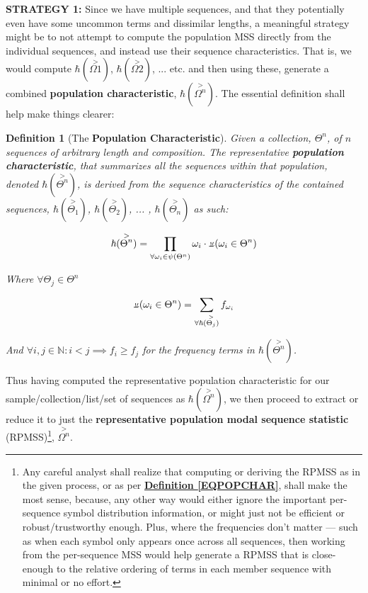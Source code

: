 \documentclass[a4paper, 18pt]{book} %
\newtheorem{defn}{Definition}
\newcommand{\invpi}{\rotatebox[origin=c]{180}{$\pi$}}
\begin{document}
\textbf{STRATEGY 1:} Since we have multiple sequences, and that they potentially even have some uncommon terms and dissimilar lengths, a meaningful strategy might be to not attempt to compute the population MSS directly from the individual sequences, and instead use their sequence characteristics. That is, we would compute $\hbar(\overset{>}{\Omega1})$, $\hbar(\overset{>}{\Omega2})$, ... etc. and then using these, generate a combined \textbf{population characteristic}, $\hbar(\overset{>}{\Omega^n})$. The essential definition shall help make things clearer:\\


\begin{defn}[The \textbf{Population Characteristic}]
\label{DEFPOPCHAR}
Given a collection, $\Theta^n$, of $n$ sequences of arbitrary length and composition. The representative \textbf{population characteristic}, that summarizes all the sequences within that population, denoted $\hbar(\overset{>}{\Theta^n})$, is derived from the sequence characteristics of the contained sequences, $\hbar(\overset{>}{\Theta_1})$, $\hbar(\overset{>}{\Theta_2})$, ... , $\hbar(\overset{>}{\Theta_n})$ as such:

\begin{equation}
\label{EQPOPCHAR}
\hbar(\overset{>}{\Theta^n}) = \prod\limits_{\forall \omega_i \in \psi(\Theta^n)} \omega_i \cdot \invpi(\omega_i \in \Theta^n)
\end{equation}

Where $\forall \Theta_j \in \Theta^n$

\begin{equation}
\invpi(\omega_i \in \Theta^n) = \sum\limits_{\forall \hbar(\overset{>}{\Theta_j})} f_{\omega_i}
\end{equation}

And $\forall i, j \in \mathbb{N}: i < j \implies f_i \geq f_j$ for the frequency terms in $\hbar(\overset{>}{\Theta^n})$.
\end{defn}


Thus having computed the representative population characteristic for our sample/collection/list/set of sequences as $\hbar(\overset{>}{\Omega^n})$, we then proceed to extract or reduce it to just the \textbf{representative population modal sequence statistic} (RPMSS)\footnote{Any careful analyst shall realize that computing or deriving the RPMSS as in the given process, or as per \textbf{\hyperref[EQPOPCHAR]{Definition \ref{EQPOPCHAR}}}, shall make the most sense, because, any other way would either ignore the important per-sequence symbol distribution information, or might just not be efficient or robust/trustworthy enough. Plus, where the frequencies don't matter --- such as when each symbol only appears once across all sequences, then working from the per-sequence MSS would help generate a RPMSS that is close-enough to the relative ordering of terms in each member sequence with minimal or no effort.}, $\overset{>}{\Omega^n}$.
\end{document}
